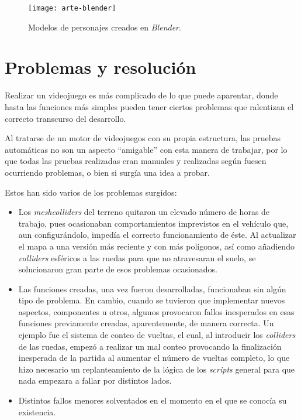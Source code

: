 \begin{figure}[h]
	\centering
	\texttt{[image: arte-blender]}
	\caption{Modelos de personajes creados en \textit{Blender}.}
	\label{fig:arte-blender}
\end{figure}

\section{Problemas y resolución}

Realizar un videojuego es más complicado de lo que puede aparentar, donde hasta las funciones más simples pueden tener ciertos problemas que ralentizan el correcto transcurso del desarrollo.

Al tratarse de un motor de videojuegos con su propia estructura, las pruebas automáticas no son un aspecto ``amigable'' con esta manera de trabajar, por lo que todas las pruebas realizadas eran manuales y realizadas según fuesen ocurriendo problemas, o bien si surgía una idea a probar.

Estos han sido varios de los problemas surgidos:
\begin{itemize}
\tightlist
	\item Los \textit{meshcolliders} del terreno quitaron un elevado número de horas de trabajo, pues ocasionaban comportamientos imprevistos en el vehículo que, aun configurándolo, impedía el correcto funcionamiento de éste. Al actualizar el mapa a una versión más reciente y con más polígonos, así como añadiendo \textit{colliders} esféricos a las ruedas para que no atravesaran el suelo, se solucionaron gran parte de esos problemas ocasionados.
	\item Las funciones creadas, una vez fueron desarrolladas, funcionaban sin algún tipo de problema. En cambio, cuando se tuvieron que implementar nuevos aspectos, componentes u otros, algunos provocaron fallos inesperados en esas funciones previamente creadas, aparentemente, de manera correcta. Un ejemplo fue el sistema de conteo de vueltas, el cual, al introducir los \textit{colliders} de las ruedas, empezó a realizar un mal conteo provocando la finalización inesperada de la partida al aumentar el número de vueltas completo, lo que hizo necesario un replanteamiento de la lógica de los \textit{scripts} general para que nada empezara a fallar por distintos lados.
	\item Distintos fallos menores solventados en el momento en el que se conocía su existencia.
\end{itemize}

